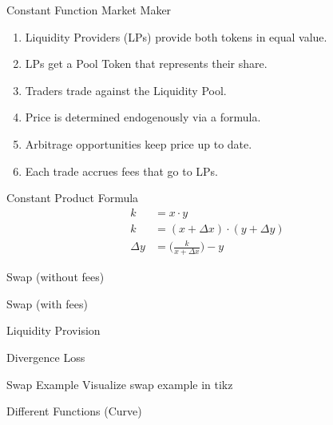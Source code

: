 \documentclass[]{beamer}
\begin{document}
\begin{frame}{Constant Function Market Maker}
\begin{figure}
\begin{tikzpicture}
		
	\end{tikzpicture}
\end{figure}


\begin{enumerate}
	\item<2-> Liquidity Providers (LPs) provide both tokens in equal value.
	\item<3-> LPs get a Pool Token that represents their share.
	\item<4-> Traders trade against the Liquidity Pool.
	\item<5-> Price is determined endogenously via a formula.
	\item<6-> Arbitrage opportunities keep price up to date.
	\item<6-> Each trade accrues fees that go to LPs.
\end{enumerate}
\end{frame}


\begin{frame}{Constant Product Formula}
\begin{align*}
		k &= x \cdot y \\
		k &= (x + \Delta x) \cdot (y + \Delta y) \\
		\Delta y &= \biggl( \frac{k}{x + \Delta x} \biggr) - y 
	\end{align*} 
\end{frame}


\begin{frame}{Swap (without fees)}

\end{frame}


\begin{frame}{Swap (with fees)}

\end{frame}


\begin{frame}{Liquidity Provision}

\end{frame}


\begin{frame}{Divergence Loss}

\end{frame}


\begin{frame}{Swap Example}
Visualize swap example in tikz
\end{frame}


\begin{frame}{Different Functions (Curve)}

\end{frame}
\end{document}
